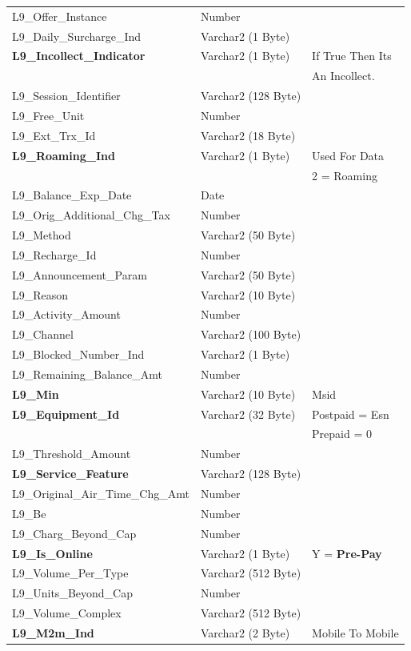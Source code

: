 \documentclass[12pt,twoside]{article}
\begin{document}
\begin{longtable}{l|l|l}
L9\_Offer\_Instance & Number & \\
L9\_Daily\_Surcharge\_Ind & Varchar2 (1 Byte) & \\
\textbf{L9\_Incollect\_Indicator} & Varchar2 (1 Byte) & If True Then Its\\
&  & An Incollect.\\
L9\_Session\_Identifier & Varchar2 (128 Byte) & \\
L9\_Free\_Unit & Number & \\
L9\_Ext\_Trx\_Id & Varchar2 (18 Byte) & \\
\textbf{L9\_Roaming\_Ind} & Varchar2 (1 Byte) & Used For Data\\
&  & 2 = Roaming\\
L9\_Balance\_Exp\_Date & Date & \\
L9\_Orig\_Additional\_Chg\_Tax & Number & \\
L9\_Method & Varchar2 (50 Byte) & \\
L9\_Recharge\_Id & Number & \\
L9\_Announcement\_Param & Varchar2 (50 Byte) & \\
L9\_Reason & Varchar2 (10 Byte) & \\
L9\_Activity\_Amount & Number & \\
L9\_Channel & Varchar2 (100 Byte) & \\
L9\_Blocked\_Number\_Ind & Varchar2 (1 Byte) & \\
L9\_Remaining\_Balance\_Amt & Number & \\
\textbf{L9\_Min} & Varchar2 (10 Byte) & Msid\\
\textbf{L9\_Equipment\_Id} & Varchar2 (32 Byte) & Postpaid = Esn\\
&  & Prepaid = 0\\
L9\_Threshold\_Amount & Number & \\
\textbf{L9\_Service\_Feature} & Varchar2 (128 Byte) & \\
L9\_Original\_Air\_Time\_Chg\_Amt & Number & \\
L9\_Be & Number & \\
L9\_Charg\_Beyond\_Cap & Number & \\
\textbf{L9\_Is\_Online} & Varchar2 (1 Byte) & Y = \textbf{Pre-Pay}\\
L9\_Volume\_Per\_Type & Varchar2 (512 Byte) & \\
L9\_Units\_Beyond\_Cap & Number & \\
L9\_Volume\_Complex & Varchar2 (512 Byte) & \\
\textbf{L9\_M2m\_Ind} & Varchar2 (2 Byte) & Mobile To Mobile\\

\end{longtable}
\end{document}
